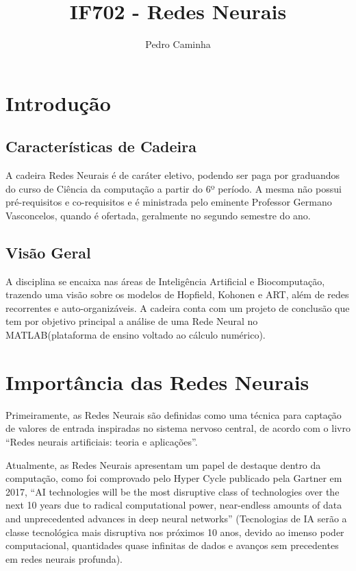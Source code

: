 \documentclass[a4paper]{article}
\title{IF702 - Redes Neurais}
\author{Pedro Caminha}
\begin{document}
\maketitle



\section{Introdução}

\subsection{Características de Cadeira}

A cadeira Redes Neurais é de caráter eletivo, podendo ser paga por graduandos do curso de Ciência da computação a partir do 6º período. A mesma não possui pré-requisitos e co-requisitos e é ministrada pelo eminente Professor Germano Vasconcelos, quando é ofertada, geralmente no segundo semestre do ano.

\subsection{Visão Geral}

A disciplina se encaixa nas áreas de Inteligência Artificial e Biocomputação, trazendo uma visão sobre os modelos de Hopfield, Kohonen e ART, além de redes recorrentes e auto-organizáveis. A cadeira conta com um projeto de conclusão que tem por objetivo principal a análise de uma Rede Neural no MATLAB(plataforma de ensino voltado ao cálculo numérico).
\section{Importância das Redes Neurais}

Primeiramente, as Redes Neurais são definidas como uma técnica para captação de valores de entrada inspiradas no sistema nervoso central, de acordo com o livro ``Redes neurais artificiais: teoria e aplicações\cite{braga2000redes}''.

Atualmente, as Redes Neurais apresentam um papel de destaque dentro da computação, como foi comprovado pelo Hyper Cycle\cite{hypercycle17} publicado pela Gartner em 2017, ``AI technologies will be the most disruptive class of technologies over the next 10 years due to radical computational power, near-endless amounts of data and unprecedented advances in deep neural networks'' (Tecnologias de IA serão a classe tecnológica mais disruptiva nos próximos 10 anos, devido ao imenso poder computacional, quantidades quase infinitas de dados e avanços sem precedentes em redes neurais profunda).
\end{document}
